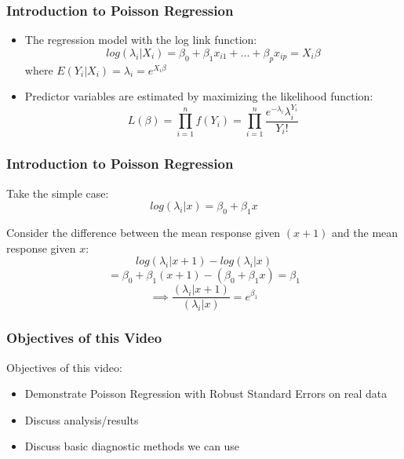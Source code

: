 \documentclass{beamer}
\begin{document}
\begin{frame}[fragile]\frametitle{Introduction to Poisson Regression}

	\begin{itemize}
		
		\item The regression model with the log link function:
 		$$ log(\lambda_i|X_i) = \beta_0 + \beta_1 x_{i1} + ... + \beta_p x_{ip} = X_i \beta $$  		
 		where $ E(Y_i|X_i) = \lambda_i = e^{X_i \beta}$

		\item Predictor variables are estimated by maximizing the likelihood function:
		$$ L(\beta) = \prod_{i=1}^{n} f(Y_i) = \prod_{i=1}^{n} \frac{ e^{-\lambda_i} \lambda_i^{Y_i} }{Y_i!} $$
		
	\end{itemize}
	
\end{frame}



\begin{frame}[fragile]\frametitle{Introduction to Poisson Regression}	
	
	Take the simple case: $$ log(\lambda_i|x) = \beta_0 + \beta_1 x $$

	Consider the difference between the mean response given $(x+1)$ and the mean response given $x$: 
			  $$ log(\lambda_i|x+1) - log(\lambda_i|x) $$
			  $$ = \beta_0 + \beta_1 (x + 1) - (\beta_0 + \beta_1 x) = \beta_1 $$
			  $$ \implies \frac{(\lambda_i|x+1)}{(\lambda_i|x)} = e^{\beta_1} $$
	
\end{frame}




\begin{frame}[fragile]\frametitle{Objectives of this Video}
	
	Objectives of this video:	
	
	\begin{itemize}
	
		\item Demonstrate Poisson Regression with Robust Standard Errors on real data
		
		\item Discuss analysis/results
		
		\item Discuss basic diagnostic methods we can use

	\end{itemize}
	
\end{frame}
\end{document}
